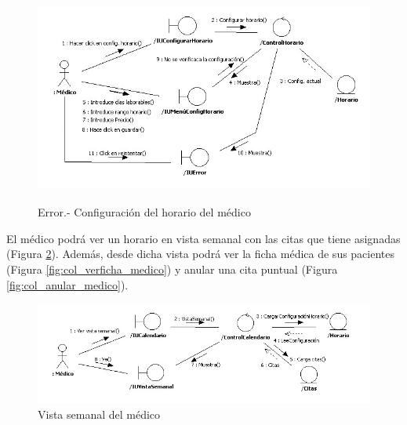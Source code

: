 \documentclass[a4paper,oneside,11pt]{book}
\begin{document}
			\begin{figure}[H]
			  \centering
			    \includegraphics[width=16cm, height=7cm]{img/jpg/colaboraciones/7_ConfiguracionHorarioMedicoError.jpg}
			  \caption{Error.- Configuración del horario del médico}
			  \label{fig:col_config_horario_medico_err}
			\end{figure}
			
			El médico podrá ver un horario en vista semanal con las citas que tiene asignadas (Figura \ref{fig:col_vistasemanal_medico}). Además, desde dicha vista podrá ver la ficha médica de sus pacientes (Figura \ref{fig:col_verficha_medico}) y anular una cita puntual (Figura \ref{fig:col_anular_medico}).
			
			\begin{figure}[H]
			  \centering
			    \includegraphics[width=16cm]{img/jpg/colaboraciones/8_VistaSemanalMedico.jpg}
			  \caption{Vista semanal del médico}
			  \label{fig:col_vistasemanal_medico}
			\end{figure}
			
\end{document}
